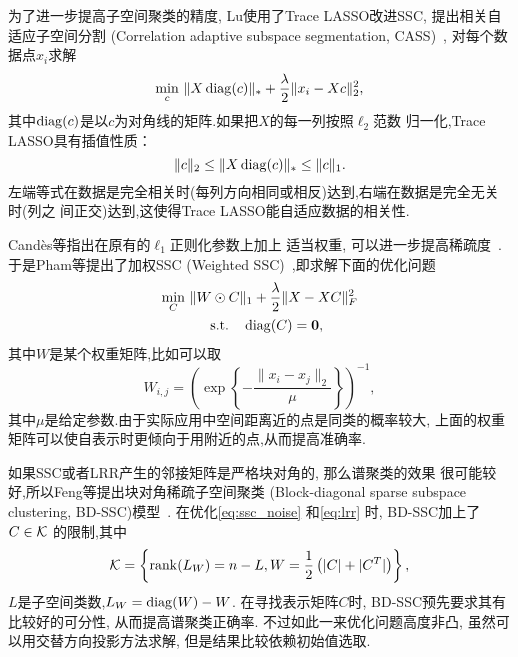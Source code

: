 为了进一步提高子空间聚类的精度, Lu使用了Trace LASSO改进SSC,
提出相关自适应子空间分割 (Correlation adaptive subspace
segmentation, CASS)~\cite{lu2013correlation}, 
对每个数据点\(x_i\)求解
\begin{equation}
  \min_{c}\, \|X\operatorname{diag}(c)\|_* + \frac{\lambda}{2}\|x_i - Xc\|_2^2,
  \label{eq:cass}
\end{equation}
其中\(\operatorname{diag}(c)\)是以\(c\)为对角线的矩阵.如果把\(X\)的每一列按照\(\ell_2\)范数
归一化,Trace LASSO具有插值性质：
\[
  \|c\|_2\le \|X\operatorname{diag}(c)\|_*\le \|c\|_1.
\]
左端等式在数据是完全相关时(每列方向相同或相反)达到,右端在数据是完全无关时(列之
间正交)达到,这使得Trace LASSO能自适应数据的相关性.

Cand\`{e}s等指出在原有的\(\ell_1\)正则化参数上加上
适当权重, 可以进一步提高稀疏度~\cite{candes2008enhancing}.
于是Pham等提出了加权SSC (Weighted SSC)~\cite{pham2012improved},即求解下面的优化问题
\begin{equation}
  \begin{gathered}
    \min_{C}\, \|W\odot C\|_1 + \frac{\lambda}{2}\|X-XC\|_F^2 \\
    \quad \text{s.t.}\quad \operatorname{diag}(C) = \mathbf{0},
  \end{gathered}
  \label{eq:wssc}
\end{equation}
其中\(W\)是某个权重矩阵,比如可以取
\[
  W_{i,j} = \left( \exp\left\{ -\frac{\|x_i-x_j\|_2}{\mu}
\right\} \right)^{-1},
\]
其中\(\mu\)是给定参数.由于实际应用中空间距离近的点是同类的概率较大,
上面的权重矩阵可以使自表示时更倾向于用附近的点,从而提高准确率.

如果SSC或者LRR产生的邻接矩阵是严格块对角的, 那么谱聚类的效果
很可能较好,所以Feng等提出块对角稀疏子空间聚类
(Block-diagonal sparse subspace clustering, BD-SSC)模型~\cite{feng2014robust}.
在优化\eqref{eq:ssc_noise} 和\eqref{eq:lrr} 时, BD-SSC加上了\(C \in \mathcal{K}\) 的限制,其中
\[
  \mathcal{K} = \left\{ \operatorname{rank}(L_W)=n-L, W=\frac{1}{2}\left( |C|+|C^T| \right) \right\},
\]
\(L\)是子空间类数,\(L_W=\operatorname{diag}(W)-W\).
在寻找表示矩阵\(C\)时, BD-SSC预先要求其有比较好的可分性, 从而提高谱聚类正确率. 
不过如此一来优化问题高度非凸, 虽然可以用交替方向投影方法求解, 但是结果比较依赖初始值选取.

